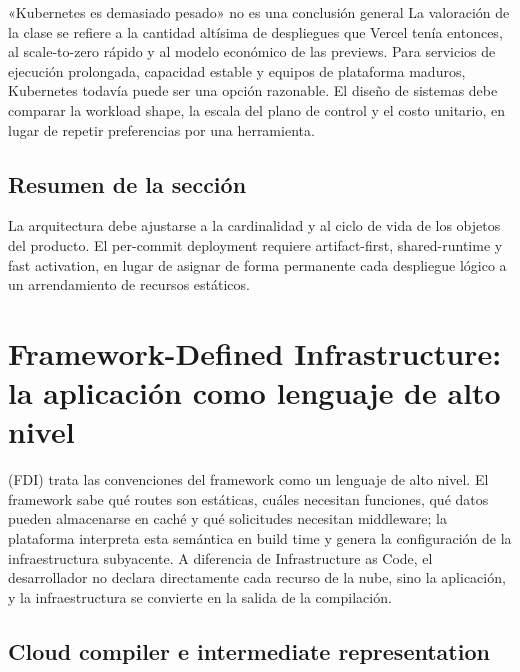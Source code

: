 \documentclass[a4paper]{article}
\begin{document}
\begin{warningbox}{«Kubernetes es demasiado pesado» no es una conclusión general}
La valoración de la clase se refiere a la cantidad altísima de despliegues que Vercel tenía entonces, al scale-to-zero rápido y al modelo económico de las previews. Para servicios de ejecución prolongada, capacidad estable y equipos de plataforma maduros, Kubernetes todavía puede ser una opción razonable. El diseño de sistemas debe comparar la workload shape, la escala del plano de control y el costo unitario, en lugar de repetir preferencias por una herramienta.
\end{warningbox}


\subsection{Resumen de la sección}

La arquitectura debe ajustarse a la cardinalidad y al ciclo de vida de los objetos del producto. El per-commit deployment requiere artifact-first, shared-runtime y fast activation, en lugar de asignar de forma permanente cada despliegue lógico a un arrendamiento de recursos estáticos.
\section{Framework-Defined Infrastructure: la aplicación como lenguaje de alto nivel}

 (FDI) trata las convenciones del framework como un lenguaje de alto nivel. El framework sabe qué routes son estáticas, cuáles necesitan funciones, qué datos pueden almacenarse en caché y qué solicitudes necesitan middleware; la plataforma interpreta esta semántica en build time y genera la configuración de la infraestructura subyacente. A diferencia de Infrastructure as Code, el desarrollador no declara directamente cada recurso de la nube, sino la aplicación, y la infraestructura se convierte en la salida de la compilación.

\subsection{Cloud compiler e intermediate representation}
\end{document}
